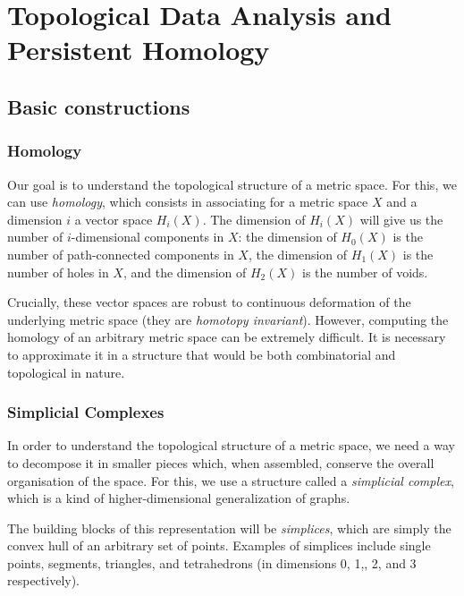 \documentclass[a4paper,11pt,openany,extrafontsizes]{memoir}
\begin{document}

\chapter{Topological Data Analysis and Persistent Homology}%
\label{cha:tda-ph}

\section{Basic constructions}
\label{sec:basic-constructions}

\subsection{Homology}%
\label{sec:homology}

Our goal is to understand the topological structure of a metric
space. For this, we can use \emph{homology}, which consists in
associating for a metric space $X$ and a dimension $i$ a vector space
$H_i(X)$. The dimension of $H_i(X)$ will give us the number of
$i$-dimensional components in $X$: the dimension of $H_0(X)$ is the
number of path-connected components in $X$, the dimension of $H_1(X)$
is the number of holes in $X$, and the dimension of $H_2(X)$ is the
number of voids.

Crucially, these vector spaces are robust to continuous deformation of
the underlying metric space (they are \emph{homotopy
  invariant}). However, computing the homology of an arbitrary metric
space can be extremely difficult. It is necessary to approximate it in
a structure that would be both combinatorial and topological in
nature.

\subsection{Simplicial Complexes}%
\label{sec:simplicial-complexes}

In order to understand the topological structure of a metric space, we
need a way to decompose it in smaller pieces which, when assembled,
conserve the overall organisation of the space. For this, we use a
structure called a \emph{simplicial complex}, which is a kind of
higher-dimensional generalization of graphs.

The building blocks of this representation will be \emph{simplices},
which are simply the convex hull of an arbitrary set of
points. Examples of simplices include single points, segments,
triangles, and tetrahedrons (in dimensions 0, 1,, 2, and 3
respectively).
\end{document}
